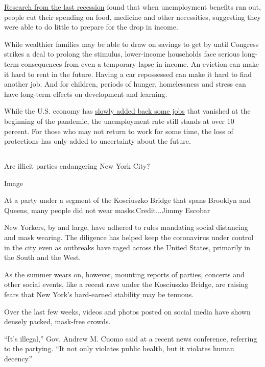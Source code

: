 \href{https://www.aeaweb.org/articles?id=10.1257/aer.20170537}{Research
from the last recession} found that when unemployment benefits ran out,
people cut their spending on food, medicine and other necessities,
suggesting they were able to do little to prepare for the drop in
income.

While wealthier families may be able to draw on savings to get by until
Congress strikes a deal to prolong the stimulus, lower-income households
face serious long-term consequences from even a temporary lapse in
income. An eviction can make it hard to rent in the future. Having a car
repossessed can make it hard to find another job. And for children,
periods of hunger, homelessness and stress can have long-term effects on
development and learning.

While the U.S. economy has
\href{https://www.nytimes.com/live/2020/08/07/business/stock-market-today-coronavirus}{slowly
added back some jobs} that vanished at the beginning of the pandemic,
the unemployment rate still stands at over 10 percent. For those who may
not return to work for some time, the loss of protections has only added
to uncertainty about the future.

\hypertarget{section-4}{%
\subsection{}\label{section-4}}

Are illicit parties endangering New York City?

Image

At a party under a segment of the Kosciuszko Bridge that spans Brooklyn
and Queens, many people did not wear masks.Credit...Jimmy Escobar

New Yorkers, by and large, have adhered to rules mandating social
distancing and mask wearing. The diligence has helped keep the
coronavirus under control in the city even as outbreaks have raged
across the United States, primarily in the South and the West.

As the summer wears on, however, mounting reports of parties, concerts
and other social events, like a recent rave under the Kosciuszko Bridge,
are raising fears that New York's hard-earned stability may be tenuous.

Over the last few weeks, videos and photos posted on social media have
shown densely packed, mask-free crowds.

``It's illegal,'' Gov. Andrew M. Cuomo said at a recent news conference,
referring to the partying. ``It not only violates public health, but it
violates human decency.''

